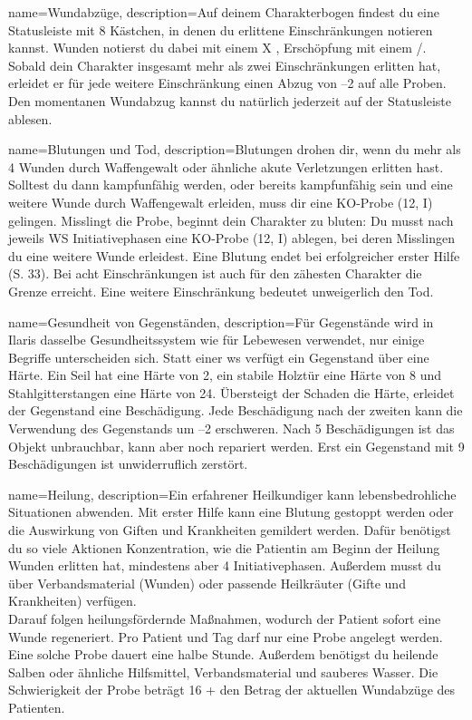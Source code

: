 {
    name={Wundabzüge},
    description={Auf deinem Charakterbogen findest du eine Statusleiste mit 8 Kästchen, in denen du erlittene Einschränkungen notieren kannst. Wunden notierst du dabei mit einem X , Erschöpfung mit einem /. Sobald dein Charakter insgesamt mehr als zwei Einschränkungen erlitten hat, erleidet er für jede weitere Einschränkung einen Abzug von –2 auf alle Proben. Den momentanen Wundabzug kannst du natürlich jederzeit auf der Statusleiste ablesen.}}

{
    name={Blutungen und Tod},
    description={Blutungen drohen dir, wenn du mehr als 4 Wunden durch Waffengewalt oder ähnliche akute Verletzungen erlitten hast. Solltest du dann kampfunfähig werden, oder bereits kampfunfähig sein und eine weitere Wunde durch Waffengewalt erleiden, muss dir eine KO-Probe (12, I) gelingen. Misslingt die Probe, beginnt dein Charakter zu bluten: Du musst nach jeweils WS Initiativephasen eine KO-Probe (12, I) ablegen, bei deren Misslingen du eine weitere Wunde erleidest. Eine Blutung endet bei erfolgreicher erster Hilfe (S. 33). Bei acht Einschränkungen ist auch für den zähesten Charakter die Grenze erreicht. Eine weitere Einschränkung bedeutet unweigerlich den Tod.}}

{
    name={Gesundheit von Gegenständen},
    description={Für Gegenstände wird in Ilaris dasselbe Gesundheitssystem wie für Lebewesen verwendet, nur einige Begriffe unterscheiden sich. Statt einer \gls{ws} verfügt ein Gegenstand über eine Härte. Ein Seil hat eine Härte von 2, ein stabile Holztür eine Härte von 8 und Stahlgitterstangen eine Härte von 24. Übersteigt der Schaden die Härte, erleidet der Gegenstand eine Beschädigung. Jede Beschädigung nach der zweiten kann die Verwendung des Gegenstands um –2 erschweren. Nach 5 Beschädigungen ist das Objekt unbrauchbar, kann aber noch repariert werden. Erst ein Gegenstand mit 9 Beschädigungen ist unwiderruflich zerstört.}}

{
    name={Heilung},
    description={Ein erfahrener Heilkundiger kann lebensbedrohliche Situationen abwenden. Mit erster Hilfe kann eine Blutung gestoppt werden oder die Auswirkung von Giften und Krankheiten gemildert werden. Dafür benötigst du so viele Aktionen Konzentration, wie die Patientin am Beginn der Heilung Wunden erlitten hat, mindestens aber 4 Initiativephasen. Außerdem musst du über Verbandsmaterial (Wunden) oder passende Heilkräuter (Gifte und Krankheiten) verfügen.\\
Darauf folgen heilungsfördernde Maßnahmen, wodurch der Patient sofort eine Wunde regeneriert. Pro Patient und Tag darf nur eine Probe angelegt werden. Eine solche Probe dauert eine halbe Stunde. Außerdem benötigst du heilende Salben oder ähnliche Hilfsmittel, Verbands­­material und sauberes Wasser. Die Schwierigkeit der Probe beträgt 16 + den Betrag der aktuellen Wundabzüge des Patienten.}}


